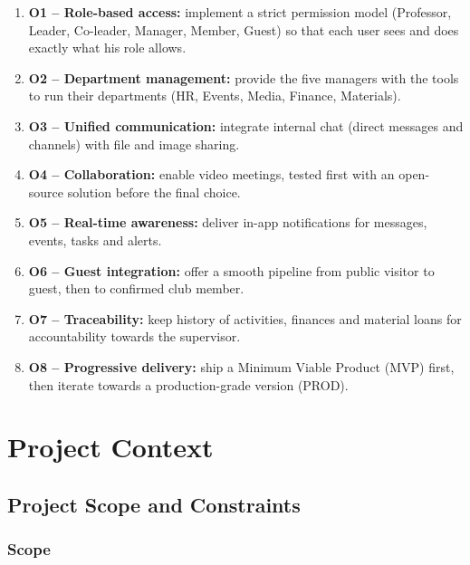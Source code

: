 \documentclass[12pt,a4paper]{report}
\begin{document}
\begin{enumerate}[leftmargin=*]
    \item \textbf{O1 -- Role-based access:} implement a strict permission model
          (Professor, Leader, Co-leader, Manager, Member, Guest) so that each user sees and
          does exactly what his role allows.
    \item \textbf{O2 -- Department management:} provide the five managers with the tools
          to run their departments (HR, Events, Media, Finance, Materials).
    \item \textbf{O3 -- Unified communication:} integrate internal chat (direct messages
          and channels) with file and image sharing.
    \item \textbf{O4 -- Collaboration:} enable video meetings, tested first with an
          open-source solution before the final choice.
    \item \textbf{O5 -- Real-time awareness:} deliver in-app notifications for messages,
          events, tasks and alerts.
    \item \textbf{O6 -- Guest integration:} offer a smooth pipeline from public visitor
          to guest, then to confirmed club member.
    \item \textbf{O7 -- Traceability:} keep history of activities, finances and material
          loans for accountability towards the supervisor.
    \item \textbf{O8 -- Progressive delivery:} ship a Minimum Viable Product (MVP) first,
          then iterate towards a production-grade version (PROD).
\end{enumerate}

\clearpage

\chapter{Project Context}

\section{Project Scope and Constraints}

\subsection{Scope}
\end{document}
